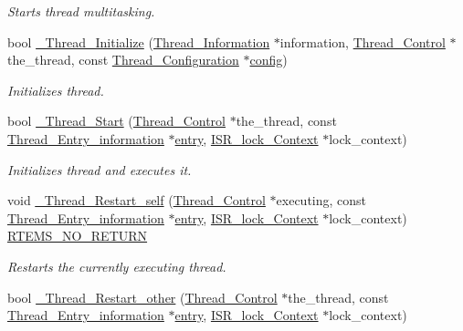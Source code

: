 \begin{DoxyCompactItemize}
\begin{DoxyCompactList}\small\item\em Starts thread multitasking. \end{DoxyCompactList}\item 
bool \mbox{\hyperlink{group__RTEMSScoreThread_gab4f561fd816d0b93318afa48f609fad2}{\+\_\+\+Thread\+\_\+\+Initialize}} (\mbox{\hyperlink{structThread__Information}{Thread\+\_\+\+Information}} $\ast$information, \mbox{\hyperlink{struct__Thread__Control}{Thread\+\_\+\+Control}} $\ast$the\+\_\+thread, const \mbox{\hyperlink{structThread__Configuration}{Thread\+\_\+\+Configuration}} $\ast$\mbox{\hyperlink{structconfig__s}{config}})
\begin{DoxyCompactList}\small\item\em Initializes thread. \end{DoxyCompactList}\item 
bool \mbox{\hyperlink{group__RTEMSScoreThread_ga03378c6b7617ec1b5fcc541423e662e5}{\+\_\+\+Thread\+\_\+\+Start}} (\mbox{\hyperlink{struct__Thread__Control}{Thread\+\_\+\+Control}} $\ast$the\+\_\+thread, const \mbox{\hyperlink{structThread__Entry__information}{Thread\+\_\+\+Entry\+\_\+information}} $\ast$\mbox{\hyperlink{structentry}{entry}}, \mbox{\hyperlink{structISR__lock__Context}{I\+S\+R\+\_\+lock\+\_\+\+Context}} $\ast$lock\+\_\+context)
\begin{DoxyCompactList}\small\item\em Initializes thread and executes it. \end{DoxyCompactList}\item 
void \mbox{\hyperlink{group__RTEMSScoreThread_gaecbbb447ef2795643c4055ecd2b0f714}{\+\_\+\+Thread\+\_\+\+Restart\+\_\+self}} (\mbox{\hyperlink{struct__Thread__Control}{Thread\+\_\+\+Control}} $\ast$executing, const \mbox{\hyperlink{structThread__Entry__information}{Thread\+\_\+\+Entry\+\_\+information}} $\ast$\mbox{\hyperlink{structentry}{entry}}, \mbox{\hyperlink{structISR__lock__Context}{I\+S\+R\+\_\+lock\+\_\+\+Context}} $\ast$lock\+\_\+context) \mbox{\hyperlink{group__RTEMSScoreBaseDefs_gaa2f0ed67aa174f684bb31b7e8bdb386f}{R\+T\+E\+M\+S\+\_\+\+N\+O\+\_\+\+R\+E\+T\+U\+RN}}
\begin{DoxyCompactList}\small\item\em Restarts the currently executing thread. \end{DoxyCompactList}\item 
bool \mbox{\hyperlink{group__RTEMSScoreThread_ga509001fb716aaf996d70507d74b769ea}{\+\_\+\+Thread\+\_\+\+Restart\+\_\+other}} (\mbox{\hyperlink{struct__Thread__Control}{Thread\+\_\+\+Control}} $\ast$the\+\_\+thread, const \mbox{\hyperlink{structThread__Entry__information}{Thread\+\_\+\+Entry\+\_\+information}} $\ast$\mbox{\hyperlink{structentry}{entry}}, \mbox{\hyperlink{structISR__lock__Context}{I\+S\+R\+\_\+lock\+\_\+\+Context}} $\ast$lock\+\_\+context)

\end{DoxyCompactItemize}
